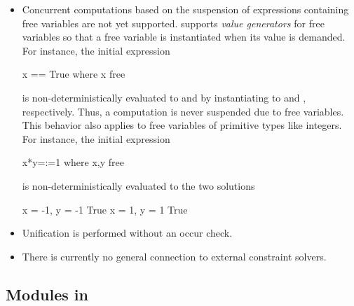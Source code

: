 \begin{itemize}
\item
Concurrent computations
based on the suspension of expressions
containing free variables are not yet supported.
\CYS supports \emph{value generators} for free variables
so that a free variable is instantiated when its value is demanded.
For instance, the initial expression
\begin{curry}
x == True where x free
\end{curry}
is non-deterministically evaluated to  and 
by instantiating  to  and , respectively.
Thus, a computation is never suspended due to free variables.
This behavior also applies to free variables of primitive types
like integers. For instance, the initial expression
\begin{curry}
x*y=:=1 where x,y free
\end{curry}
is non-deterministically evaluated to the two solutions
\begin{curry}
{x = -1, y = -1} True
{x = 1, y = 1} True
\end{curry}
\item
Unification is performed without an occur check.
\item
There is currently no general connection to external constraint solvers.
\end{itemize}


\subsection{Modules in \CYS}
\label{sec-modules}

